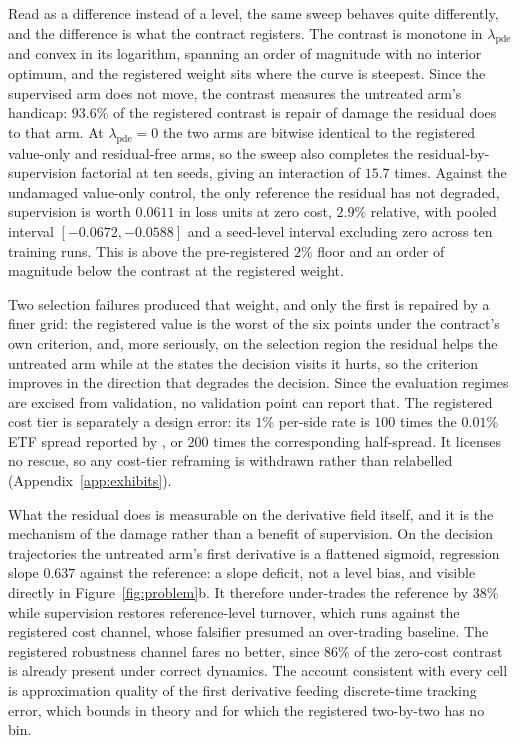 \documentclass{article}
\begin{document}
Read as a difference instead of a level, the same sweep behaves quite differently,
and the difference is what the contract registers. The contrast is monotone in
$\lambda_{\mathrm{pde}}$ and convex in its logarithm, spanning an order of magnitude
with no interior optimum, and the registered weight sits where the curve is
steepest. Since the supervised arm does not move, the contrast measures the
untreated arm's handicap: $93.6\%$ of the registered contrast is repair of damage
the residual does to that arm. At $\lambda_{\mathrm{pde}} = 0$ the two arms are
bitwise identical to the registered value-only and residual-free arms, so the sweep
also completes the residual-by-supervision factorial at ten seeds, giving an
interaction of $15.7$ times. Against the undamaged value-only control, the only
reference the residual has not degraded, supervision is worth $0.0611$ in loss units
at zero cost, $2.9\%$ relative, with pooled interval $[-0.0672, -0.0588]$ and a
seed-level interval excluding zero across ten training runs. This is above the
pre-registered $2\%$ floor and an order of magnitude below the contrast at the
registered weight.

Two selection failures produced that weight, and only the first is repaired by a
finer grid: the registered value is the worst of the six points under the contract's
own criterion, and, more seriously, on the selection region the residual helps the
untreated arm while at the states the decision visits it hurts, so the criterion
improves in the direction that degrades the decision. Since the evaluation regimes
are excised from validation, no validation point can report that. The registered
cost tier is separately a design error: its $1\%$ per-side rate is $100$ times the
$0.01\%$ ETF spread reported by \citet{armstrong2024deep}, or $200$ times the
corresponding half-spread. It licenses no rescue, so any cost-tier reframing is
withdrawn rather than relabelled
(Appendix~\ref{app:exhibits}).

What the residual does is measurable on the derivative field itself, and it is the
mechanism of the damage rather than a benefit of supervision. On the decision
trajectories the untreated arm's first derivative is a flattened sigmoid, regression
slope $0.637$ against the reference: a slope deficit, not a level bias, and visible
directly in Figure~\ref{fig:problem}b. It therefore under-trades the reference by
$38\%$ while supervision restores reference-level turnover, which runs against the
registered cost channel, whose falsifier presumed an over-trading baseline. The
registered robustness channel fares no better, since $86\%$ of the zero-cost
contrast is already present under correct dynamics. The account consistent with
every cell is approximation quality of the first derivative feeding discrete-time
tracking error, which \citet{noguer2026derivative} bounds in theory and for which
the registered two-by-two has no bin.
\end{document}
